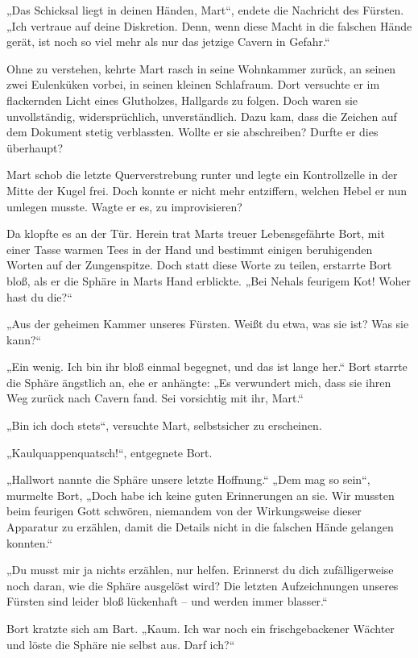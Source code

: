 \documentclass[10pt, a4paper, oneside]{book}
\begin{document}
„Das Schicksal liegt in deinen Händen, Mart“, endete die Nachricht des Fürsten. „Ich vertraue auf deine Diskretion. Denn, wenn diese Macht in die falschen Hände gerät, ist noch so viel mehr als nur das jetzige Cavern in Gefahr.“ \bigskip

Ohne zu verstehen, kehrte Mart rasch in seine Wohnkammer zurück, an seinen zwei Eulenküken vorbei, in seinen kleinen Schlafraum. Dort versuchte er im flackernden Licht eines Glutholzes, Hallgards zu folgen. Doch waren sie unvollständig, widersprüchlich, unverständlich. Dazu kam, dass die Zeichen auf dem Dokument stetig verblassten. Wollte er sie abschreiben? Durfte er dies überhaupt?

Mart schob die letzte Querverstrebung runter und legte ein Kontrollzelle in der Mitte der Kugel frei. Doch konnte er nicht mehr entziffern, welchen Hebel er nun umlegen musste. Wagte er es, zu improvisieren? \bigskip

Da klopfte es an der Tür. Herein trat Marts treuer Lebensgefährte Bort, mit einer Tasse warmen Tees in der Hand und bestimmt einigen beruhigenden Worten auf der Zungenspitze. Doch statt diese Worte zu teilen, erstarrte Bort bloß, als er die Sphäre in Marts Hand erblickte.
„Bei Nehals feurigem Kot! Woher hast du die?“

„Aus der geheimen Kammer unseres Fürsten. Weißt du etwa, was sie ist? Was sie kann?“

„Ein wenig. Ich bin ihr bloß einmal begegnet, und das ist lange her.“ Bort starrte die Sphäre ängstlich an, ehe er anhängte: „Es verwundert mich, dass sie ihren Weg zurück nach Cavern fand. Sei vorsichtig mit ihr, Mart.“

„Bin ich doch stets“, versuchte Mart, selbstsicher zu erscheinen.

„Kaulquappenquatsch!“, entgegnete Bort. 

„Hallwort nannte die Sphäre unsere letzte Hoffnung.“ „Dem mag so sein“, murmelte Bort, „Doch habe ich keine guten Erinnerungen an sie. Wir mussten beim feurigen Gott schwören, niemandem von der Wirkungsweise dieser Apparatur zu erzählen, damit die Details nicht in die falschen Hände gelangen konnten.“

„Du musst mir ja nichts erzählen, nur helfen. Erinnerst du dich zufälligerweise noch daran, wie die Sphäre ausgelöst wird? Die letzten Aufzeichnungen unseres Fürsten sind leider bloß lückenhaft – und werden immer blasser.“

Bort kratzte sich am Bart. „Kaum. Ich war noch ein frischgebackener Wächter und löste die Sphäre nie selbst aus. Darf ich?“
\end{document}
